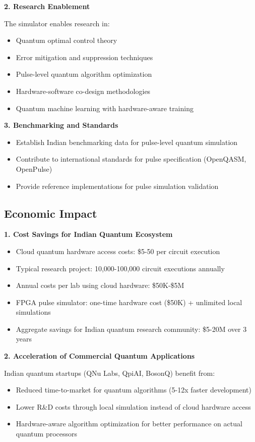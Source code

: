 \documentclass[12pt,a4paper]{article}
\begin{document}
\textbf{2. Research Enablement}

The simulator enables research in:
\begin{itemize}[noitemsep]
\item Quantum optimal control theory
\item Error mitigation and suppression techniques
\item Pulse-level quantum algorithm optimization
\item Hardware-software co-design methodologies
\item Quantum machine learning with hardware-aware training
\end{itemize}

\textbf{3. Benchmarking and Standards}

\begin{itemize}[noitemsep]
\item Establish Indian benchmarking data for pulse-level quantum simulation
\item Contribute to international standards for pulse specification (OpenQASM, OpenPulse)
\item Provide reference implementations for pulse simulation validation
\end{itemize}

\subsection{Economic Impact}

\textbf{1. Cost Savings for Indian Quantum Ecosystem}

\begin{itemize}[noitemsep]
\item Cloud quantum hardware access costs: \$5-50 per circuit execution
\item Typical research project: 10,000-100,000 circuit executions annually
\item Annual costs per lab using cloud hardware: \$50K-\$5M
\item FPGA pulse simulator: one-time hardware cost (\$50K) + unlimited local simulations
\item Aggregate savings for Indian quantum research community: \$5-20M over 3 years
\end{itemize}

\textbf{2. Acceleration of Commercial Quantum Applications}

Indian quantum startups (QNu Labs, QpiAI, BosonQ) benefit from:
\begin{itemize}[noitemsep]
\item Reduced time-to-market for quantum algorithms (5-12x faster development)
\item Lower R\&D costs through local simulation instead of cloud hardware access
\item Hardware-aware algorithm optimization for better performance on actual quantum processors
\end{itemize}
\end{document}
